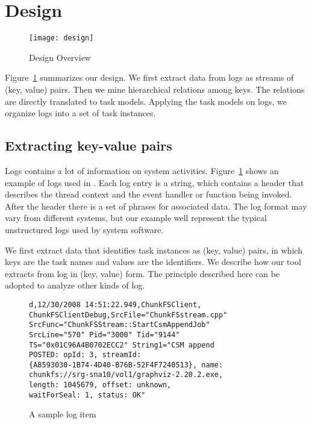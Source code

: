 
\section{Design}
\label{sec:design}

\begin{figure}
\centering
\texttt{[image: design]}
\caption{Design Overview}
\label{fig:design}
\end{figure}

Figure~\ref{fig:design} summarizes our design. We
first extract data from logs as streams of (key,
value) pairs. Then we mine hierarchical relations
among keys. The relations are directly translated
to task models. Applying the task models on logs, we
organize logs into a set of task instances.

\subsection{Extracting key-value pairs}

Logs contains a lot of information on system
activities. Figure~\ref{fig:design} shows an example
of logs used in \cosmos. Each log entry is a string,
which contains a header that describes the thread
context and the event handler or function being invoked. 
After the header there is a set of phrases for 
associated data. The log format may vary from different
systems, but our example well represent the typical
unstructured logs used by system software.


We first extract data that identifies task instances
as (key, value) pairs, in which keys are the task names
and values are the identifiers.
We describe how our tool extracts from \cosmos log in (key, value) form. The
principle described here can be adopted to analyze other
kinds of log.

\begin{figure}
\begin{verbatim}
d,12/30/2008 14:51:22.949,ChunkFSClient,
ChunkFSClientDebug,SrcFile="ChunkFSstream.cpp"
SrcFunc="ChunkFSStream::StartCsmAppendJob"
SrcLine="570" Pid="3000" Tid="9144"
TS="0x01C96A4B0702ECC2" String1="CSM append
POSTED: opId: 3, streamId:
{A8593030-1B74-4D40-B76B-52F4F7240513}, name:
chunkfs://srg-sna10/vol1/graphviz-2.20.2.exe,
length: 1045679, offset: unknown,
waitForSeal: 1, status: OK"
\end{verbatim}
\caption{A sample log item}
\label{fig:logitem}
\end{figure}

